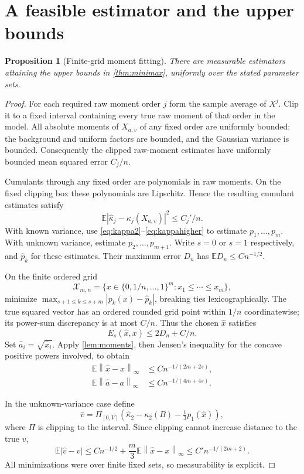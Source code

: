 \documentclass[11pt,a4paper]{article}
\numberwithin{equation}{section}
\newtheorem{proposition}[theorem]{Proposition}
\theoremstyle{definition}
\theoremstyle{remark}
\newcommand{\E}{\mathbb E}
\newcommand{\cX}{\mathcal X}
\newcommand{\norm}[1]{\left\lVert#1\right\rVert}
\begin{document}
\section{A feasible estimator and the upper bounds}
\label{sec:upper}

\begin{proposition}[Finite-grid moment fitting]
\label{prop:estimator}
There are measurable estimators attaining the upper bounds in
\cref{thm:minimax}, uniformly over the stated parameter sets.
\end{proposition}
\begin{proof}
For each required raw moment order $j$ form the sample average of $X^j$.
Clip it to a fixed interval containing every true raw moment of that order
in the model. All absolute moments of $X_{a,v}$ of any fixed order are
uniformly bounded: the background and uniform factors are bounded, and the
Gaussian variance is bounded. Consequently the clipped raw-moment estimates
have uniformly bounded mean squared error $C_j/n$.

Cumulants through any fixed order are polynomials in raw moments. On the
fixed clipping box these polynomials are Lipschitz. Hence the resulting
cumulant estimates satisfy
\begin{equation}
 \E|\widehat\kappa_j-\kappa_j(X_{a,v})|^2\le C_j'/n.
 \label{eq:kappa-MSE}
\end{equation}
With known variance, use \eqref{eq:kappa2}--\eqref{eq:kappahigher} to
estimate $p_1,\ldots,p_m$. With unknown variance, estimate
$p_2,\ldots,p_{m+1}$. Write $s=0$ or $s=1$ respectively, and
$\widehat p_k$ for these estimates. Their maximum error $D_n$ has
$\E D_n\le Cn^{-1/2}$.

On the finite ordered grid
\[
 \cX_{m,n}=\{x\in\{0,1/n,\ldots,1\}^m:x_1\le\cdots\le x_m\},
\]
minimize $\max_{s+1\le k\le s+m}|p_k(x)-\widehat p_k|$,
breaking ties lexicographically. The true squared vector has an ordered
rounded grid point within $1/n$ coordinatewise; its power-sum discrepancy
is at most $C/n$. Thus the chosen $\widehat x$ satisfies
\begin{equation}
 E_s(\widehat x,x)\le2D_n+C/n.
 \label{eq:fit-error}
\end{equation}
Set $\widehat a_i=\sqrt{\widehat x_i}$. Apply \cref{lem:moments}, then
Jensen's inequality for the concave positive powers involved, to obtain
\begin{align}
 \E\norm{\widehat x-x}_\infty&\le Cn^{-1/(2m+2s)},
 \label{eq:x-rate}\\
 \E\norm{\widehat a-a}_\infty&\le Cn^{-1/(4m+4s)}.
 \label{eq:a-upper}
\end{align}

In the unknown-variance case define
\[
 \widehat v=\Pi_{[0,V]}
 \left(\widehat\kappa_2-\kappa_2(B)-\tfrac13p_1(\widehat x)\right),
\]
where $\Pi$ is clipping to the interval. Since clipping cannot increase
distance to the true $v$,
\[
 \E|\widehat v-v|
 \le Cn^{-1/2}+\frac m3\E\norm{\widehat x-x}_\infty
 \le C'n^{-1/(2m+2)}.
\]
All minimizations were over finite fixed sets, so measurability is explicit.
\end{proof}
\end{document}
